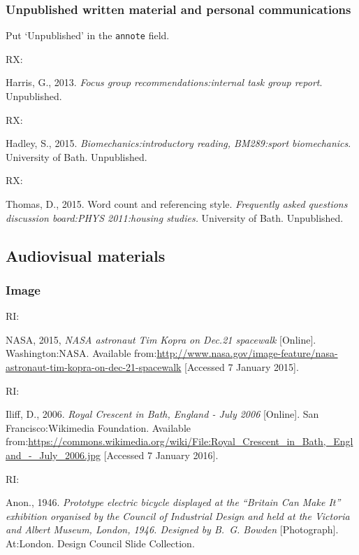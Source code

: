 \subsubsection*{Unpublished written material and personal communications}

Put `Unpublished' in the \texttt{annote} field.

RX: \cite{harris2013fgr}

Harris, G., 2013. \emph{Focus group recommendations:\@ internal task group
report}. Unpublished.


RX: \cite{hadley2015bir}

Hadley, S., 2015. \emph{Biomechanics:\@ introductory reading, BM289:\@ sport
biomechanics}. University of Bath. Unpublished.


RX: \cite{thomas2015wcr}

Thomas, D., 2015. Word count and referencing style. \emph{Frequently
asked questions discussion board:\@ PHYS 2011:\@ housing studies.}
University of Bath. Unpublished.



\subsection{Audiovisual materials}

\subsubsection*{Image}

RI: \cite{nasa2015nat}

NASA, 2015, \emph{NASA astronaut Tim Kopra on Dec.\@ 21 spacewalk} [Online]. Washington:\@ NASA. Available from:\@ \url{http://www.nasa.gov/image-feature/nasa-astronaut-tim-kopra-on-dec-21-spacewalk} [Accessed 7 January 2015].


RI: \cite{iliff2006rcb}

Iliff, D., 2006. \emph{Royal Crescent in Bath, England - July 2006} [Online]. San Francisco:\@ Wikimedia Foundation. Available from:\@ \url{https://commons.wikimedia.org/wiki/File:Royal_Crescent_in_Bath,_England_-_July_2006.jpg} [Accessed 7 January 2016].


RI: \cite{anon1946peb}

Anon., 1946. \emph{Prototype electric bicycle displayed at the \enquote{Britain Can Make It} exhibition organised by the Council of Industrial Design and held at the Victoria and Albert Museum, London, 1946. Designed by B.~G. Bowden} [Photograph]. At:\@ London. Design Council Slide Collection.



